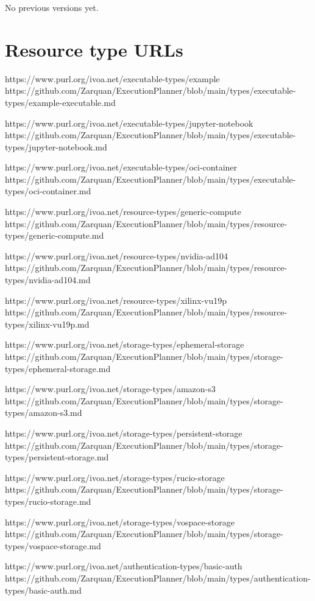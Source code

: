 \documentclass[11pt,a4paper]{ivoa}
\begin{document}
No previous versions yet.

\pagebreak
\appendix
\section{Resource type URLs}


https://www.purl.org/ivoa.net/executable-types/example
https://github.com/Zarquan/ExecutionPlanner/blob/main/types/executable-types/example-executable.md

https://www.purl.org/ivoa.net/executable-types/jupyter-notebook
https://github.com/Zarquan/ExecutionPlanner/blob/main/types/executable-types/jupyter-notebook.md

https://www.purl.org/ivoa.net/executable-types/oci-container
https://github.com/Zarquan/ExecutionPlanner/blob/main/types/executable-types/oci-container.md

https://www.purl.org/ivoa.net/resource-types/generic-compute
https://github.com/Zarquan/ExecutionPlanner/blob/main/types/resource-types/generic-compute.md

https://www.purl.org/ivoa.net/resource-types/nvidia-ad104
https://github.com/Zarquan/ExecutionPlanner/blob/main/types/resource-types/nvidia-ad104.md

https://www.purl.org/ivoa.net/resource-types/xilinx-vu19p
https://github.com/Zarquan/ExecutionPlanner/blob/main/types/resource-types/xilinx-vu19p.md

https://www.purl.org/ivoa.net/storage-types/ephemeral-storage
https://github.com/Zarquan/ExecutionPlanner/blob/main/types/storage-types/ephemeral-storage.md

https://www.purl.org/ivoa.net/storage-types/amazon-s3
https://github.com/Zarquan/ExecutionPlanner/blob/main/types/storage-types/amazon-s3.md

https://www.purl.org/ivoa.net/storage-types/persistent-storage
https://github.com/Zarquan/ExecutionPlanner/blob/main/types/storage-types/persistent-storage.md

https://www.purl.org/ivoa.net/storage-types/rucio-storage
https://github.com/Zarquan/ExecutionPlanner/blob/main/types/storage-types/rucio-storage.md

https://www.purl.org/ivoa.net/storage-types/vospace-storage
https://github.com/Zarquan/ExecutionPlanner/blob/main/types/storage-types/vospace-storage.md

https://www.purl.org/ivoa.net/authentication-types/basic-auth
https://github.com/Zarquan/ExecutionPlanner/blob/main/types/authentication-types/basic-auth.md
\end{document}
